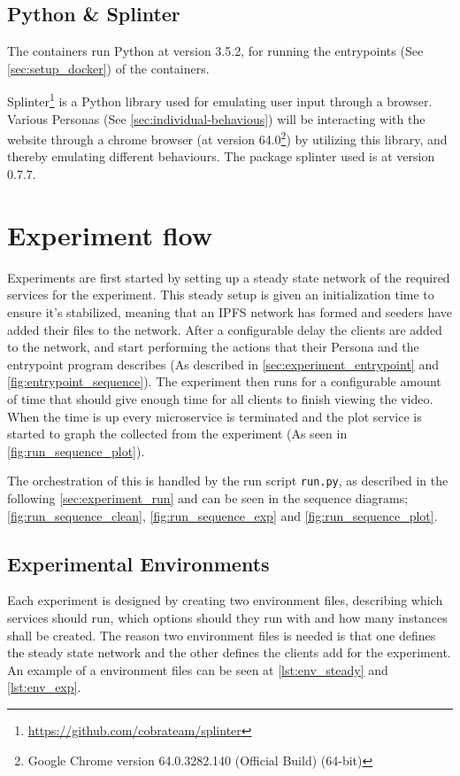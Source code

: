 \subsection{Python \& Splinter}
\label{sec:setup_python}
\label{sec:setup_splinter}
The containers run Python at version 3.5.2, for running the entrypoints (See \autoref{sec:setup_docker}) of the containers.

Splinter\footnote{\url{https://github.com/cobrateam/splinter}} is a Python library used for emulating user input through a browser. Various Personas (See \autoref{sec:individual-behavious}) will be interacting with the website through a chrome browser (at version 64.0\footnote{Google Chrome version 64.0.3282.140 (Official Build) (64-bit)}) by utilizing this library, and thereby emulating different behaviours.
The package splinter used is at version 0.7.7.


\section{Experiment flow}
\label{sec:impl-flow}
Experiments are first started by setting up a steady state network of the required services for the experiment. This steady setup is given an initialization time to ensure it's stabilized, meaning that an \ac{IPFS} network has formed and seeders have added their files to the network.
After a configurable delay the clients are added to the network, and start performing the actions that their Persona and the entrypoint program describes (As described in \autoref{sec:experiment_entrypoint} and \autoref{fig:entrypoint_sequence}).
The experiment then runs for a configurable amount of time that should give enough time for all clients to finish viewing the video. When the time is up every microservice is terminated and the plot service is started to graph the collected from the experiment (As seen in \autoref{fig:run_sequence_plot}).

The orchestration of this is handled by the run script \texttt{run.py}, as described in the following \autoref{sec:experiment_run} and can be seen in the sequence diagrams; \autoref{fig:run_sequence_clean}, \ref{fig:run_sequence_exp} and \ref{fig:run_sequence_plot}.

\subsection{Experimental Environments}
\label{sec:experiment_env}
Each experiment is designed by creating two environment files, describing which services should run, which options should they run with and how many instances shall be created. The reason two environment files is needed is that one defines the steady state network and the other defines the clients add for the experiment. An example of a environment files can be seen at \autoref{lst:env_steady} and \ref{lst:env_exp}.

